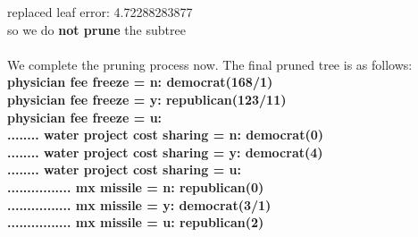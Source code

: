 \documentclass[paper=a4, fontsize=13pt]{article} %
\begin{document}
replaced leaf error:  4.72288283877\\
so we do \textbf{not prune} the subtree
\\
\\
We complete the pruning process now.
The final pruned tree is as follows:\\
\textbf{physician fee freeze = n: democrat(168/1)\\
physician fee freeze = y: republican(123/11)\\
physician fee freeze = u: \\
........	water project cost sharing = n: democrat(0)\\
........	water project cost sharing = y: democrat(4)\\
........	water project cost sharing = u:\\
................		mx missile = n: republican(0)\\
................		mx missile = y: democrat(3/1)\\
................		mx missile = u: republican(2)\\}

\newpage
\end{document}
